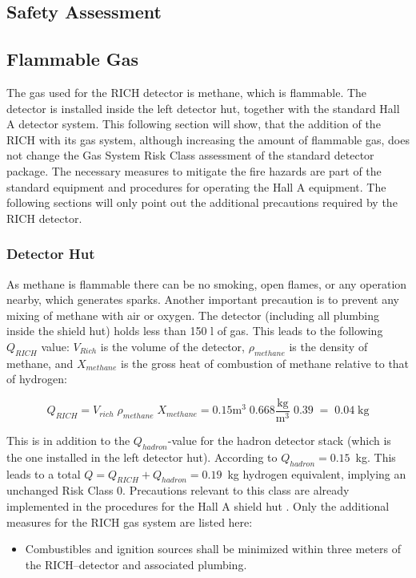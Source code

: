 \begin{safetyen}{0}{0}
\section{Safety Assessment}  

\subsection{Flammable Gas}
\label{sec:rich_hazard}
 
The gas used for the RICH detector 
is methane, which is flammable. The detector is installed inside
the left detector hut, together with the standard Hall A detector system.
This following section will show, that the addition of the RICH with its gas system,
although increasing the amount of flammable gas, does not change the 
Gas System Risk Class assessment of the standard detector package. 
The necessary measures to mitigate the fire hazards are part of the standard
equipment and procedures for operating the Hall A equipment.
The following sections will only point out the additional precautions required by the RICH detector.

\subsubsection{Detector Hut}

As methane is flammable there can be no  
smoking, open flames, or any operation nearby, which generates sparks.  
Another important precaution is to prevent any mixing of methane with air or 
oxygen.
The detector (including all plumbing inside the shield hut) holds less 
than  150 l of gas. 
This leads to the following $Q_{RICH}$ value:  
$V_{Rich}$ is the  
volume of the detector, 
$\rho_{methane}$ is the density of methane, 
and $X_{methane}$ is the gross heat of combustion of methane relative 
to that of hydrogen: 
 
\begin{equation} 
Q_{RICH} = V_{rich} \; \rho_{methane} \; X_{methane} 
= 0.15 \mbox{m}^3 \; 0.668 \frac{\mbox{kg}}{\mbox{m}^3} \; 0.39 \; = \; 0.04 \; \mbox{kg}
\end{equation} 
 
This is in addition to the $Q_{hadron}$-value for the hadron detector stack (which is 
the one installed in the left detector hut). According to \cite{HazardCalc} $Q_{hadron}=0.15$~kg.
This leads to a total $Q = Q_{RICH} + Q_{hadron} = 0.19$~kg hydrogen equivalent, 
implying an unchanged Risk Class 0. Precautions relevant to this class are already 
implemented in the procedures for the Hall A shield hut \cite{Hawgswww}. Only the 
additional measures for the RICH gas system are listed here:
\begin{itemize}
\item Combustibles and ignition sources shall be minimized within three  
meters of the RICH--detector and associated plumbing. 


\end{itemize}
\end{safetyen}
